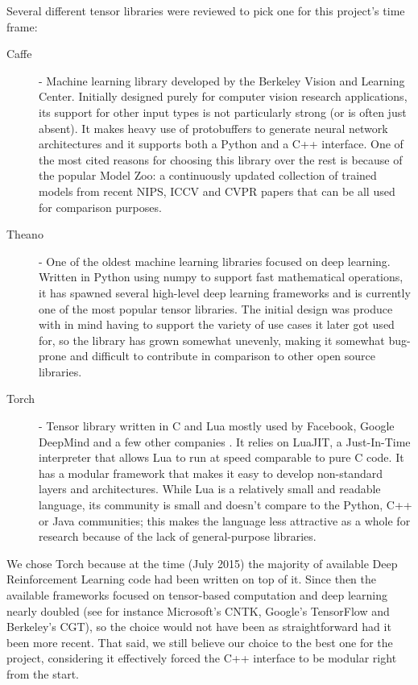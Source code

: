 Several different tensor libraries were reviewed to pick one for this project's
time frame:

\begin{description}
\item [Caffe] - Machine learning library developed by the Berkeley Vision and
  Learning Center. Initially designed purely for computer vision research
  applications, its support for other input types is not particularly strong (or
  is often just absent). It makes heavy use of protobuffers to generate neural
  network architectures and it supports both a Python and a C++ interface. One
  of the most cited reasons for choosing this library over the rest is because
  of the popular Model Zoo: a continuously updated collection of trained models
  from recent NIPS, ICCV and CVPR papers that can be all used for comparison
  purposes.
  
\item [Theano] - One of the oldest machine learning libraries focused on deep
  learning. Written in Python using numpy to support fast mathematical
  operations, it has spawned several high-level deep learning frameworks and is
  currently one of the most popular tensor libraries. The initial design was
  produce with in mind having to support the variety of use cases it later got
  used for, so the library has grown somewhat unevenly, making it somewhat
  bug-prone and difficult to contribute in comparison to other open source
  libraries.

\item [Torch] - Tensor library written in C and Lua mostly used by Facebook,
  Google DeepMind and a few other companies \cite{soumith}. It relies on LuaJIT,
  a Just-In-Time interpreter that allows Lua to run at speed comparable to pure
  C code. It has a modular framework that makes it easy to develop non-standard
  layers and architectures. While Lua is a relatively small and readable
  language, its community is small and doesn't compare to the Python, C++ or
  Java communities; this makes the language less attractive as a whole for
  research because of the lack of general-purpose libraries.
\end{description}

We chose Torch because at the time (July 2015) the majority of
available Deep Reinforcement Learning code had been written on top of it. Since
then the available frameworks focused on tensor-based computation and deep
learning nearly doubled (see for instance Microsoft's CNTK, Google's TensorFlow
and Berkeley's CGT), so the choice would not have been as straightforward had it
been more recent. That said, we still believe our choice to the best one for the
project, considering it effectively forced the C++ interface to be modular right
from the start.
 
